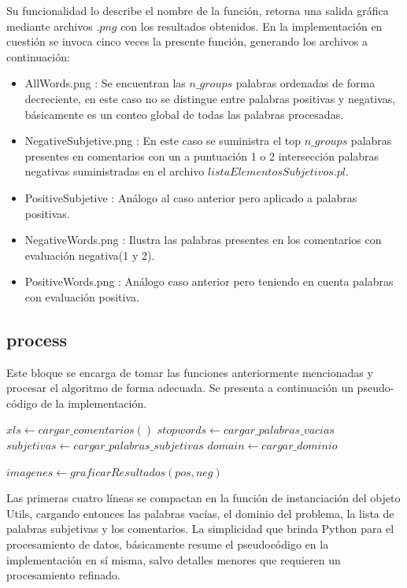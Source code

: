 \documentclass[12pt]{article}
\begin{document}
Su funcionalidad lo describe el nombre de la función, retorna una salida gráfica mediante archivos $.png$ con los resultados obtenidos.
En la implementación en cuestión se invoca cinco veces la presente función, generando los archivos a continuación:
\begin{itemize}
  \item AllWords.png : Se encuentran las $n\_groups$ palabras ordenadas de forma decreciente, en este caso no se distingue entre palabras positivas y negativas, básicamente es un conteo global de todas las palabras procesadas.
  \item NegativeSubjetive.png : En este caso se suministra el top $n\_groups$ palabras presentes en comentarios con un a puntuación 1 o 2 intersección palabras negativas suministradas en el archivo $listaElementosSubjetivos.pl$.
  \item PositiveSubjetive : Análogo al caso anterior pero aplicado a palabras positivas.
  \item NegativeWords.png : Ilustra las palabras presentes en los comentarios con evaluación negativa(1 y 2).
  \item PositiveWords.png : Análogo caso anterior pero teniendo en cuenta palabras con evaluación positiva.
\end{itemize}


\subsection{process}
Este bloque se encarga de tomar las funciones anteriormente mencionadas y procesar el algoritmo de forma adecuada.
Se presenta a continuación un pseudo-código de la implementación.

\begin{algorithmic}
  \State $xls \gets cargar\_comentarios()$
  \State $stopwords \gets cargar\_palabras\_vacias$
  \State $subjetivas \gets cargar\_palabras\_subjetivas$
  \State $domain \gets cargar\_dominio$
  
     \EndFor
  \EndFor
  
  \State $imagenes \gets graficarResultados(pos, neg)$
\end{algorithmic}
Las primeras cuatro líneas se compactan en la función de instanciación del objeto Utils, cargando entonces las palabras vacías, el dominio del problema, la lista de palabras subjetivas y los comentarios.
La simplicidad que brinda Python para el procesamiento de datos, básicamente resume el pseudocódigo en la implementación en sí misma, salvo detalles menores que requieren un procesamiento refinado.
\end{document}
